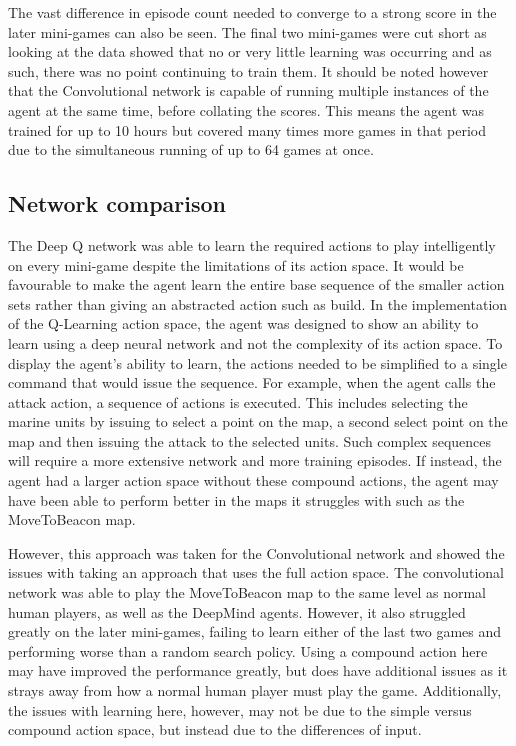 The vast difference in episode count needed to converge to a strong score in the
later mini-games can also be seen. The final two mini-games were cut short as
looking at the data showed that no or very little learning was occurring and as
such, there was no point continuing to train them. It should be noted however
that the Convolutional network is capable of running multiple instances of the
agent at the same time, before collating the scores. This means the agent was
trained for up to 10 hours but covered many times more games in that period due
to the simultaneous running of up to 64 games at once.

\subsection{Network comparison}

The Deep Q network was able to learn the required actions to play intelligently
on every mini-game despite the limitations of its action space. It would be
favourable to make the agent learn the entire base sequence of the smaller
action sets rather than giving an abstracted action such as build. In the
implementation of the Q-Learning action space, the agent was designed to show an
ability to learn using a deep neural network and not the complexity of its
action space. To display the agent's ability to learn, the actions needed to be
simplified to a single command that would issue the sequence. For example, when
the agent calls the attack action, a sequence of actions is executed. This
includes selecting the marine units by issuing to select a point on the map, a
second select point on the map and then issuing the attack to the selected
units. Such complex sequences will require a more extensive network and more
training episodes. If instead, the agent had a larger action space without
these compound actions, the agent may have been able to perform better in the
maps it struggles with such as the MoveToBeacon map.

However, this approach was taken for the Convolutional network and showed the
issues with taking an approach that uses the full action space. The
convolutional network was able to play the MoveToBeacon map to the same level as
normal human players, as well as the DeepMind agents. However, it also struggled
greatly on the later mini-games, failing to learn either of the last two games
and performing worse than a random search policy. Using a compound action here
may have improved the performance greatly, but does have additional issues as it
strays away from how a normal human player must play the game. Additionally,
the issues with learning here, however, may not be due to the simple versus
compound action space, but instead due to the differences of input.

